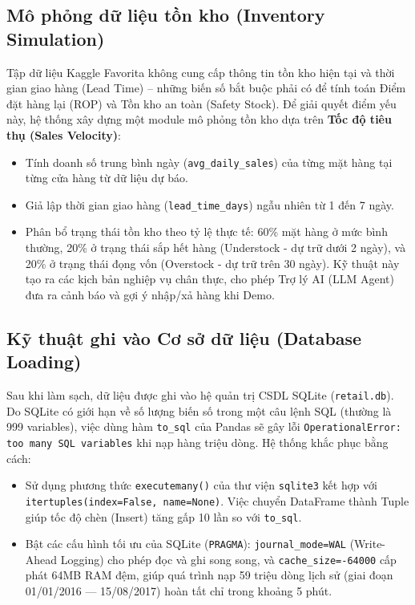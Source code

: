 \documentclass[12pt,a4paper]{report}
\begin{document}
\subsection{Mô phỏng dữ liệu tồn kho (Inventory Simulation)}
Tập dữ liệu Kaggle Favorita không cung cấp thông tin tồn kho hiện tại và thời gian giao hàng (Lead Time) – những biến số bắt buộc phải có để tính toán Điểm đặt hàng lại (ROP) và Tồn kho an toàn (Safety Stock). Để giải quyết điểm yếu này, hệ thống xây dựng một module mô phỏng tồn kho dựa trên \textbf{Tốc độ tiêu thụ (Sales Velocity)}:
\begin{itemize}
    \item Tính doanh số trung bình ngày (\texttt{avg\_daily\_sales}) của từng mặt hàng tại từng cửa hàng từ dữ liệu dự báo.
    \item Giả lập thời gian giao hàng (\texttt{lead\_time\_days}) ngẫu nhiên từ 1 đến 7 ngày.
    \item Phân bổ trạng thái tồn kho theo tỷ lệ thực tế: 60\% mặt hàng ở mức bình thường, 20\% ở trạng thái sắp hết hàng (Understock - dự trữ dưới 2 ngày), và 20\% ở trạng thái đọng vốn (Overstock - dự trữ trên 30 ngày). Kỹ thuật này tạo ra các kịch bản nghiệp vụ chân thực, cho phép Trợ lý AI (LLM Agent) đưa ra cảnh báo và gợi ý nhập/xả hàng khi Demo.
\end{itemize}

\subsection{Kỹ thuật ghi vào Cơ sở dữ liệu (Database Loading)}
Sau khi làm sạch, dữ liệu được ghi vào hệ quản trị CSDL SQLite (\texttt{retail.db}). Do SQLite có giới hạn về số lượng biến số trong một câu lệnh SQL (thường là 999 variables), việc dùng hàm \texttt{to\_sql} của Pandas sẽ gây lỗi \texttt{OperationalError: too many SQL variables} khi nạp hàng triệu dòng. Hệ thống khắc phục bằng cách:
\begin{itemize}
    \item Sử dụng phương thức \texttt{executemany()} của thư viện \texttt{sqlite3} kết hợp với \texttt{itertuples(index=False, name=None)}. Việc chuyển DataFrame thành Tuple giúp tốc độ chèn (Insert) tăng gấp 10 lần so với \texttt{to\_sql}.
    \item Bật các cấu hình tối ưu của SQLite (\texttt{PRAGMA}): \texttt{journal\_mode=WAL} (Write-Ahead Logging) cho phép đọc và ghi song song, và \texttt{cache\_size=-64000} cấp phát 64MB RAM đệm, giúp quá trình nạp 59 triệu dòng lịch sử (giai đoạn 01/01/2016 --- 15/08/2017) hoàn tất chỉ trong khoảng 5 phút.
\end{itemize}
\end{document}
